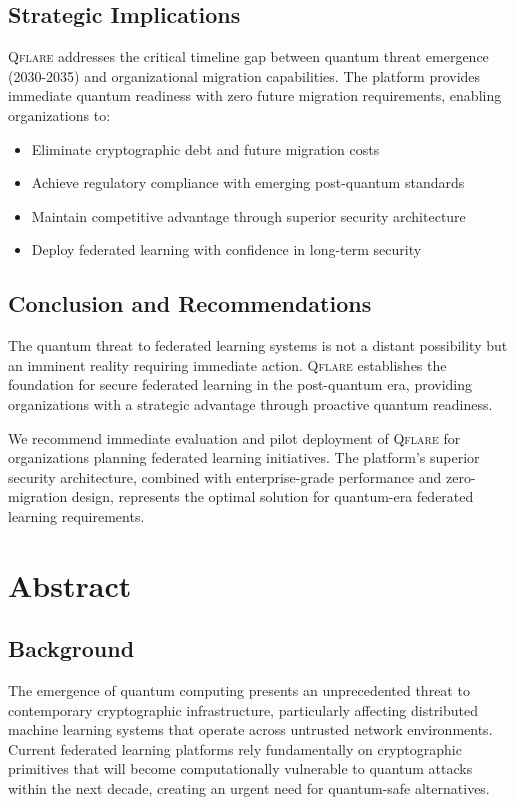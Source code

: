 \documentclass[12pt,a4paper,twoside]{book}
\newcommand{\qflare}{\textsc{Qflare}}
\begin{document}
\section*{Strategic Implications}

\qflare{} addresses the critical timeline gap between quantum threat emergence (2030-2035) and organizational migration capabilities. The platform provides immediate quantum readiness with zero future migration requirements, enabling organizations to:
\begin{itemize}
\item Eliminate cryptographic debt and future migration costs
\item Achieve regulatory compliance with emerging post-quantum standards
\item Maintain competitive advantage through superior security architecture
\item Deploy federated learning with confidence in long-term security
\end{itemize}

\section*{Conclusion and Recommendations}

The quantum threat to federated learning systems is not a distant possibility but an imminent reality requiring immediate action. \qflare{} establishes the foundation for secure federated learning in the post-quantum era, providing organizations with a strategic advantage through proactive quantum readiness.

We recommend immediate evaluation and pilot deployment of \qflare{} for organizations planning federated learning initiatives. The platform's superior security architecture, combined with enterprise-grade performance and zero-migration design, represents the optimal solution for quantum-era federated learning requirements.

\chapter*{Abstract}

\section*{Background}
The emergence of quantum computing presents an unprecedented threat to contemporary cryptographic infrastructure, particularly affecting distributed machine learning systems that operate across untrusted network environments. Current federated learning platforms rely fundamentally on cryptographic primitives that will become computationally vulnerable to quantum attacks within the next decade, creating an urgent need for quantum-safe alternatives.
\end{document}

